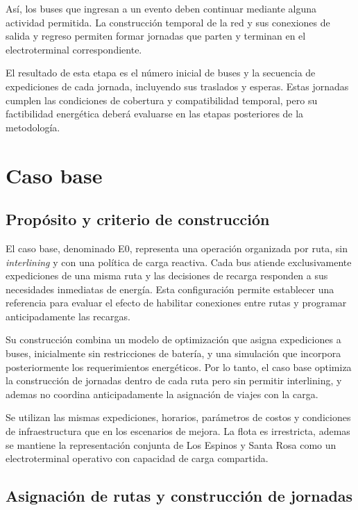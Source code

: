 Así, los buses que ingresan a un evento deben continuar mediante alguna
actividad permitida. La construcción temporal de la red y sus conexiones
de salida y regreso permiten formar jornadas que parten y terminan
en el electroterminal correspondiente.

El resultado de esta etapa es el número inicial de buses y la secuencia
de expediciones de cada jornada, incluyendo sus traslados y esperas.
Estas jornadas cumplen las condiciones de cobertura y compatibilidad
temporal, pero su factibilidad energética deberá evaluarse en las
etapas posteriores de la metodología.

\section{Caso base}

\subsection{Propósito y criterio de construcción}

El caso base, denominado E0, representa una operación organizada por ruta,
sin \textit{interlining} y con una política de carga reactiva. Cada bus
atiende exclusivamente expediciones de una misma ruta y las decisiones
de recarga responden a sus necesidades inmediatas de energía. Esta
configuración permite establecer una referencia para evaluar el efecto
de habilitar conexiones entre rutas y programar anticipadamente las recargas.

Su construcción combina un modelo de optimización que asigna expediciones
a buses, inicialmente sin restricciones de batería, y una simulación que
incorpora posteriormente los requerimientos energéticos. Por lo tanto,
el caso base optimiza la construcción de jornadas dentro de cada ruta pero sin permitir interlining, y ademas no coordina anticipadamente la asignación de viajes con la carga.

Se utilizan las mismas expediciones, horarios, parámetros de costos
y condiciones de infraestructura que en los escenarios de mejora.
La flota es irrestricta, ademas se mantiene la representación conjunta de Los Espinos y Santa Rosa
como un electroterminal operativo con capacidad de carga compartida.

\subsection{Asignación de rutas y construcción de jornadas}

